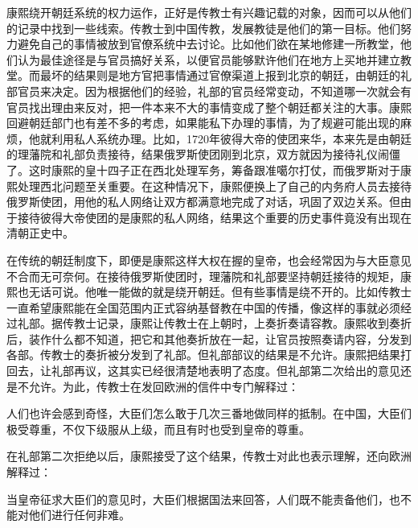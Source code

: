 
康熙绕开朝廷系统的权力运作，正好是传教士有兴趣记载的对象，因而可以从他们的记录中找到一些线索。传教士到中国传教，发展教徒是他们的第一目标。他们努力避免自己的事情被放到官僚系统中去讨论。比如他们欲在某地修建一所教堂，他们认为最佳途径是与官员搞好关系，以便官员能够默许他们在地方上买地并建立教堂。而最坏的结果则是地方官把事情通过官僚渠道上报到北京的朝廷，由朝廷的礼部官员来决定。因为根据他们的经验，礼部的官员经常变动，不知道哪一次就会有官员找出理由来反对，把一件本来不大的事情变成了整个朝廷都关注的大事。康熙回避朝廷部门也有差不多的考虑，如果能私下办理的事情，为了规避可能出现的麻烦，他就利用私人系统办理。比如，1720年彼得大帝的使团来华，本来先是由朝廷的理藩院和礼部负责接待，结果俄罗斯使团刚到北京，双方就因为接待礼仪闹僵了。这时康熙的皇十四子正在西北处理军务，筹备跟准噶尔打仗，而俄罗斯对于康熙处理西北问题至关重要。在这种情况下，康熙便换上了自己的内务府人员去接待俄罗斯使团，用他的私人网络让双方都满意地完成了对话，巩固了双边关系。但由于接待彼得大帝使团的是康熙的私人网络，结果这个重要的历史事件竟没有出现在清朝正史中。



在传统的朝廷制度下，即便是康熙这样大权在握的皇帝，也会经常因为与大臣意见不合而无可奈何。在接待俄罗斯使团时，理藩院和礼部要坚持朝廷接待的规矩，康熙也无话可说。他唯一能做的就是绕开朝廷。但有些事情是绕不开的。比如传教士一直希望康熙能在全国范围内正式容纳基督教在中国的传播，像这样的事就必须经过礼部。据传教士记录，康熙让传教士在上朝时，上奏折奏请容教。康熙收到奏折后，装作什么都不知道，把它和其他奏折放在一起，让官员按照奏请内容，分发到各部。传教士的奏折被分发到了礼部。但礼部部议的结果是不允许。康熙把结果打回去，让礼部再议，这其实已经很清楚地表明了态度。但礼部第二次给出的意见还是不允许。为此，传教士在发回欧洲的信件中专门解释过：



\begin{bookquote}人们也许会感到奇怪，大臣们怎么敢于几次三番地做同样的抵制。在中国，大臣们极受尊重，不仅下级服从上级，而且有时也受到皇帝的尊重。\end{bookquote}


在礼部第二次拒绝以后，康熙接受了这个结果，传教士对此也表示理解，还向欧洲解释过：



\begin{bookquote}当皇帝征求大臣们的意见时，大臣们根据国法来回答，人们既不能责备他们，也不能对他们进行任何非难。\end{bookquote}

